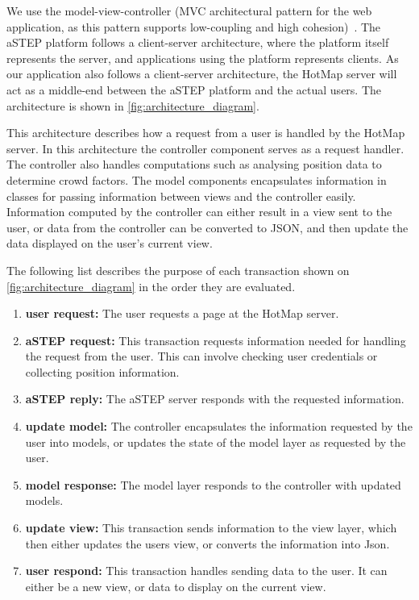 We use the model-view-controller (MVC architectural pattern for the web application, as this pattern supports low-coupling and high cohesion)~\cite{website:MVC}. The aSTEP platform follows a client-server architecture, where the platform itself represents the server, and applications using the platform represents clients. As our application also follows a client-server architecture, the HotMap server will act as a middle-end between the aSTEP platform and the actual users. The architecture is shown in \cref{fig:architecture_diagram}.


This architecture describes how a request from a user is handled by the HotMap server. In this architecture the controller component serves as a request handler. The controller also handles computations such as analysing position data to determine crowd factors. The model components encapsulates information in classes for passing information between views and the controller easily. Information computed by the controller can either result in a view sent to the user, or data from the controller can be converted to JSON, and then update the data displayed on the user's current view. 


The following list describes the purpose of each transaction shown on \cref{fig:architecture_diagram} in the order they are evaluated.

\begin{enumerate}
    \item \textbf{user request:} The user requests a page at the HotMap server.
    \item \textbf{aSTEP request:} This transaction requests information needed for handling the request from the user. This can involve checking user credentials or collecting position information.
    \item \textbf{aSTEP reply:} The aSTEP server responds with the requested information.
    \item \textbf{update model:} The controller encapsulates the information requested by the user into models, or updates the state of the model layer as requested by the user.
    \item \textbf{model response:} The model layer responds to the controller with updated models.
    \item \textbf{update view:} This transaction sends information to the view layer, which then either updates the users view, or converts the information into Json.
    \item \textbf{user respond:} This transaction handles sending data to the user. It can either be a new view, or data to display on the current view.
\end{enumerate}


